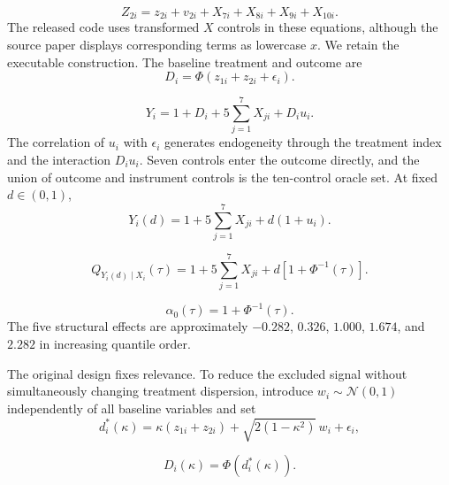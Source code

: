 \begin{equation}
  Z_{2i}=z_{2i}+v_{2i}+X_{7i}+X_{8i}+X_{9i}+X_{10i}.
  \label{eq:dgp-instrument2}
\end{equation}
The released code uses transformed $X$ controls in these equations, although the source paper displays corresponding terms as lowercase $x$. We retain the executable construction. The baseline treatment and outcome are
\begin{equation}
  D_i=\Phi(z_{1i}+z_{2i}+\epsilon_i).
  \label{eq:dgp-treatment-baseline}
\end{equation}

\begin{equation}
  Y_i=1+D_i+5\sum_{j=1}^{7}X_{ji}+D_i u_i.
  \label{eq:dgp-outcome}
\end{equation}
The correlation of $u_i$ with $\epsilon_i$ generates endogeneity through the treatment index and the interaction $D_i u_i$. Seven controls enter the outcome directly, and the union of outcome and instrument controls is the ten-control oracle set. At fixed $d\in(0,1)$,
\begin{equation}
  Y_i(d)=1+5\sum_{j=1}^{7}X_{ji}+d(1+u_i).
  \label{eq:dgp-potential-outcome}
\end{equation}

\begin{equation}
  Q_{Y_i(d)\mid X_i}(\tau)
  =1+5\sum_{j=1}^{7}X_{ji}
  +d\left[1+\Phi^{-1}(\tau)\right].
  \label{eq:dgp-structural-quantile}
\end{equation}

\begin{equation}
  \alpha_0(\tau)=1+\Phi^{-1}(\tau).
  \label{eq:dgp-alpha-true}
\end{equation}
The five structural effects are approximately $-0.282$, $0.326$, $1.000$, $1.674$, and $2.282$ in increasing quantile order.

\label{sec:instrument-relevance-extension}
The original design fixes relevance. To reduce the excluded signal without simultaneously changing treatment dispersion, introduce $w_i\sim\mathcal N(0,1)$ independently of all baseline variables and set
\begin{equation}
  d_i^*(\kappa)
  =\kappa(z_{1i}+z_{2i})
  +\sqrt{2(1-\kappa^2)}\,w_i
  +\epsilon_i,
  \label{eq:dgp-kappa-index}
\end{equation}

\begin{equation}
  D_i(\kappa)=\Phi\!\left(d_i^*(\kappa)\right).
  \label{eq:dgp-treatment-kappa}
\end{equation}

